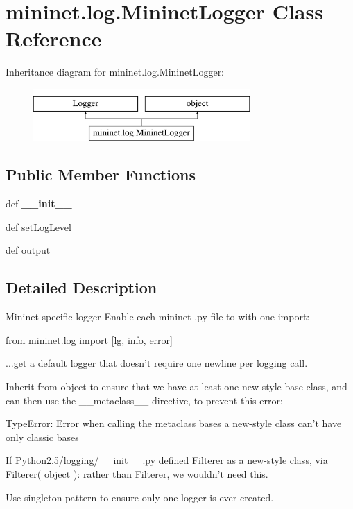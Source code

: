 \hypertarget{classmininet_1_1log_1_1MininetLogger}{\section{mininet.\-log.\-Mininet\-Logger Class Reference}
\label{classmininet_1_1log_1_1MininetLogger}
}
Inheritance diagram for mininet.\-log.\-Mininet\-Logger\-:\begin{figure}[H]
\begin{center}
\leavevmode
\includegraphics[height=2.000000cm]{classmininet_1_1log_1_1MininetLogger}
\end{center}
\end{figure}
\subsection*{Public Member Functions}
\begin{DoxyCompactItemize}
\item 
\hypertarget{classmininet_1_1log_1_1MininetLogger_a1f8cb5552a11a4694512e59d2b7834a7}{def {\bfseries \-\_\-\-\_\-init\-\_\-\-\_\-}}\label{classmininet_1_1log_1_1MininetLogger_a1f8cb5552a11a4694512e59d2b7834a7}

\item 
def \hyperlink{classmininet_1_1log_1_1MininetLogger_a5e32991d6a5bc1f11da8ef46a178bc9d}{set\-Log\-Level}
\item 
def \hyperlink{classmininet_1_1log_1_1MininetLogger_a2b0c766815f087c2b2462755e5174a72}{output}
\end{DoxyCompactItemize}


\subsection{Detailed Description}
\begin{DoxyVerb}Mininet-specific logger
   Enable each mininet .py file to with one import:

   from mininet.log import [lg, info, error]

   ...get a default logger that doesn't require one newline per logging
   call.

   Inherit from object to ensure that we have at least one new-style base
   class, and can then use the __metaclass__ directive, to prevent this
   error:

   TypeError: Error when calling the metaclass bases
   a new-style class can't have only classic bases

   If Python2.5/logging/__init__.py defined Filterer as a new-style class,
   via Filterer( object ): rather than Filterer, we wouldn't need this.

   Use singleton pattern to ensure only one logger is ever created.\end{DoxyVerb}
 

